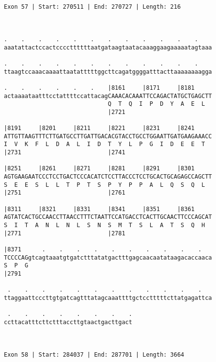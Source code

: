 \documentclass{article}
\begin{document}
\begin{Verbatim}
                                               
 
Exon 57 | Start: 270511 | End: 270727 | Length: 216



.    .    .    .    .    .    .    .    .    .    .    .    
aaatattactccactccccttttttaatgataagtaatacaaaggaagaaaaatagtaaa
                                                            
.    .    .    .    .    .    .    .    .    .    .    .    
ttaagtccaaacaaaattaatatttttggcttcagatggggatttacttaaaaaaaagga
                                                            
.    .    .    .    .    .    |8161     |8171     |8181     
actaaaataatttcctattttccattacagCAAACACAAATTCCAGACTATGCTGAGCTT
                              Q  T  Q  I  P  D  Y  A  E  L  
                              |2721                         
  
|8191     |8201     |8211     |8221     |8231     |8241     
ATTGTTAAGTTTCTTGATGCCTTGATTGACACGTACCTGCCTGGAATTGATGAAGAAACC
I  V  K  F  L  D  A  L  I  D  T  Y  L  P  G  I  D  E  E  T  
|2731                         |2741                         
  
|8251     |8261     |8271     |8281     |8291     |8301     
AGTGAAGAATCCCTCCTGACTCCCACATCTCCTTACCCTCCTGCACTGCAGAGCCAGCTT
S  E  E  S  L  L  T  P  T  S  P  Y  P  P  A  L  Q  S  Q  L  
|2751                         |2761                         
  
|8311     |8321     |8331     |8341     |8351     |8361     
AGTATCACTGCCAACCTTAACCTTTCTAATTCCATGACCTCACTTGCAACTTCCCAGCAT
S  I  T  A  N  L  N  L  S  N  S  M  T  S  L  A  T  S  Q  H  
|2771                         |2781                         
  
|8371      .    .    .    .    .    .    .    .    .    .   
TCCCCAGgtcagtaaatgtgatctttatatgactttgagcaacaatataagacaccaaca
S  P  G                                                     
|2791                                                       
  
 .    .    .    .    .    .    .    .    .    .    .    .   
ttaggaattcccttgtgatcagtttatagcaaattttgctcctttttcttatgagattca
                                                            
 .    .    .    .    .    .    .    .
ccttacatttcttctttaccttgtaactgacttgact
                                     
                                     
 
Exon 58 | Start: 284037 | End: 287701 | Length: 3664




\end{Verbatim}
\end{document}
